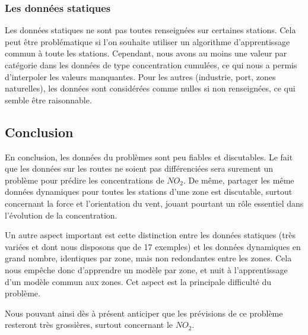\subsubsection{Les données statiques}

Les données statiques ne sont pas toutes renseignées sur certaines stations. Cela peut être problématique si l'on souhaite utiliser un algorithme d'apprentissage commun à toute les stations. Cependant, nous avons au moins une valeur par catégorie dans les données de type concentration cumulées, ce qui nous a permis d'interpoler les valeurs manquantes. Pour les autres (industrie, port, zones naturelles), les données sont considérées comme nulles si non renseignées, ce qui semble être raisonnable.


\subsection{Conclusion}

En conclusion, les données du problèmes sont peu fiables et discutables. Le fait que les données sur les routes ne soient pas différenciées sera surement un problème pour prédire les concentrations de $NO_2$. De même, partager les même données dynamiques pour toutes les stations d'une zone est discutable, surtout concernant la force et l'orientation du vent, jouant pourtant un rôle essentiel dans l'évolution de la concentration.

Un autre aspect important est cette distinction entre les données statiques (très variées et dont nous disposons que de 17 exemples) et les données dynamiques en grand nombre, identiques par zone, mais non redondantes entre les zones. Cela nous empêche donc d'apprendre un modèle par zone, et nuit à l'apprentissage d'un modèle commun aux zones. Cet aspect est la principale difficulté du problème.

Nous pouvant ainsi dès à présent anticiper que les prévisions de ce problème resteront très grossières, surtout concernant le $NO_2$.

